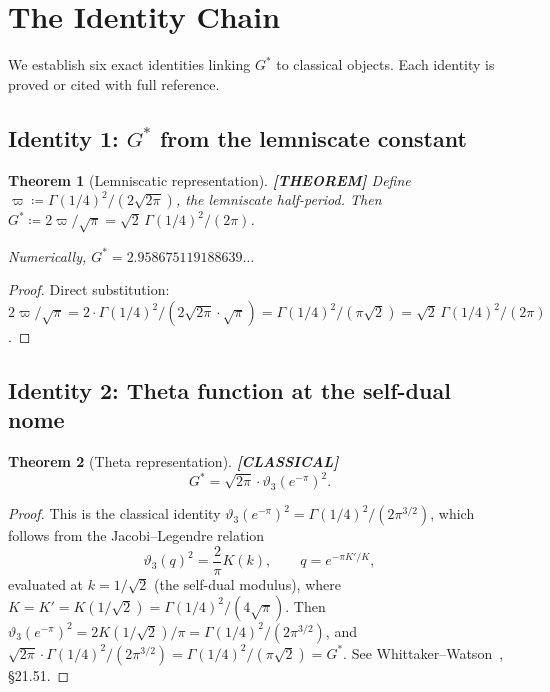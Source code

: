 \documentclass[11pt]{article}
\theoremstyle{tight}
\newtheorem{theorem}{Theorem}[section]
\theoremstyle{plainroman}
\begin{document}
\section{The Identity Chain}

We establish six exact identities linking $G^*$ to classical objects.
Each identity is proved or cited with full reference.

\subsection{Identity 1: $G^*$ from the lemniscate constant}

\begin{theorem}[Lemniscatic representation]\label{thm:gstar-varpi}
\textbf{[THEOREM]}
Define $\varpi\coloneqq\Gamma(1/4)^2/(2\sqrt{2\pi})$, the lemniscate half-period.
Then $G^*\coloneqq 2\varpi/\sqrt{\pi}=\sqrt{2}\,\Gamma(1/4)^2/(2\pi)$.

Numerically, $G^*=2.958675119188639\ldots$
\end{theorem}
\begin{proof}
Direct substitution: $2\varpi/\sqrt{\pi}=2\cdot\Gamma(1/4)^2/(2\sqrt{2\pi}\cdot\sqrt{\pi})=\Gamma(1/4)^2/(\pi\sqrt{2})=\sqrt{2}\,\Gamma(1/4)^2/(2\pi)$.
\end{proof}

\subsection{Identity 2: Theta function at the self-dual nome}

\begin{theorem}[Theta representation]\label{thm:gstar-theta}
\textbf{[CLASSICAL]}
\[
G^*=\sqrt{2\pi}\cdot\vartheta_3(e^{-\pi})^2.
\]
\end{theorem}
\begin{proof}
This is the classical identity $\vartheta_3(e^{-\pi})^2=\Gamma(1/4)^2/(2\pi^{3/2})$, which follows from the Jacobi--Legendre relation
\[
\vartheta_3(q)^2=\frac{2}{\pi}K(k), \qquad q=e^{-\pi K'/K},
\]
evaluated at $k=1/\sqrt{2}$ (the self-dual modulus), where $K=K'=K(1/\sqrt{2})=\Gamma(1/4)^2/(4\sqrt{\pi})$.
Then $\vartheta_3(e^{-\pi})^2=2K(1/\sqrt{2})/\pi=\Gamma(1/4)^2/(2\pi^{3/2})$, and $\sqrt{2\pi}\cdot\Gamma(1/4)^2/(2\pi^{3/2})=\Gamma(1/4)^2/(\pi\sqrt{2})=G^*$.
See Whittaker--Watson~\cite{whittaker}, \S21.51.
\end{proof}
\end{document}
